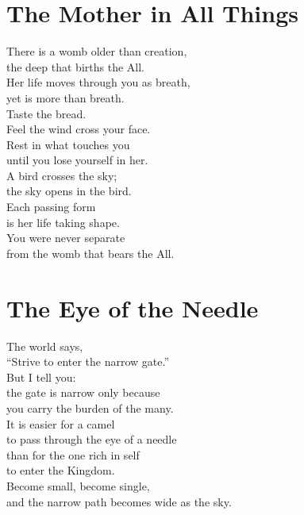 \documentclass[10pt, openright]{book}
\newcommand{\sectionbreak}{\filbreak}
\newcommand{\sayingsource}[1]{\par\nopagebreak\vspace{0.3\baselineskip}{\raggedleft\footnotesize\itshape #1\par}}
\begin{document}
\sayingsource{Tao Te Ching 51 · Thomas 36}

\sectionbreak

\section{The Mother in All Things}\label{the-mother-in-all-things}

There is a womb older than creation,\\
the deep that births the All.\\
Her life moves through you as breath,\\
yet is more than breath.\\
Taste the bread.\\
Feel the wind cross your face.\\
Rest in what touches you\\
until you lose yourself in her.\\
A bird crosses the sky;\\
the sky opens in the bird.\\
Each passing form\\
is her life taking shape.\\
You were never separate\\
from the womb that bears the All.

\sayingsource{Tao Te Ching 25, 52 · Gospel of the Hebrews · Thunder,
Perfect Mind · Vijñāna Bhairava 74 · Genesis 1:2}

\sectionbreak

\section{The Eye of the Needle}\label{the-eye-of-the-needle}

The world says,\\
``Strive to enter the narrow gate.''\\
But I tell you:\\
the gate is narrow only because\\
you carry the burden of the many.\\
It is easier for a camel\\
to pass through the eye of a needle\\
than for the one rich in self\\
to enter the Kingdom.\\
Become small, become single,\\
and the narrow path becomes wide as the sky.
\end{document}
